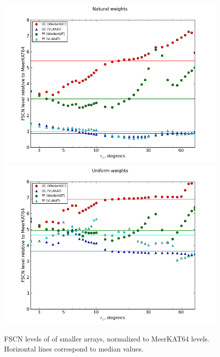 \documentclass{aa}
\begin{document}
\begin{figure}
  \includegraphics[width=\columnwidth]{cc-multiobs-frac-natural}
  \includegraphics[width=\columnwidth]{cc-multiobs-frac-uniform}
\caption{\label{fig:fscn-relative}FSCN levels of of smaller arrays, normalized to MeerKAT64 levels. Horizontal lines correspond to median values.}

\end{figure}
\end{document}

